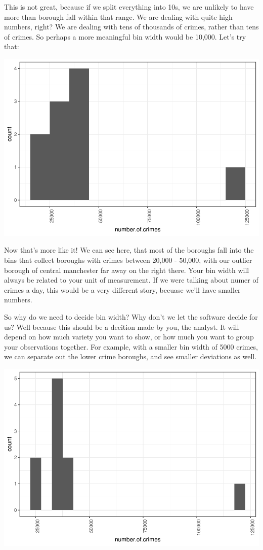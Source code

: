 \documentclass[
]{book}
\begin{document}
This is not great, because if we split everything into 10s, we are unlikely to have more than borough fall within that range. We are dealing with quite high numbers, right? We are dealing with tens of thousands of crimes, rather than tens of crimes. So perhaps a more meaningful bin width would be 10,000. Let's try that:

\includegraphics{bookdown-demo_files/figure-latex/unnamed-chunk-22-1.pdf}

Now that's more like it! We can see here, that most of the boroughs fall into the bins that collect boroughs with crimes between 20,000 - 50,000, with our outlier borough of central manchester far away on the right there. Your bin width will always be related to your unit of measurement. If we were talking about numer of crimes a day, this would be a very different story, becuase we'll have smaller numbers.

So why do we need to decide bin width? Why don't we let the software decide for us? Well because this should be a decition made by you, the analyst. It will depend on how much variety you want to show, or how much you want to group your observations together. For example, with a smaller bin width of 5000 crimes, we can separate out the lower crime boroughs, and see smaller deviations as well.

\includegraphics{bookdown-demo_files/figure-latex/unnamed-chunk-23-1.pdf}
\end{document}
